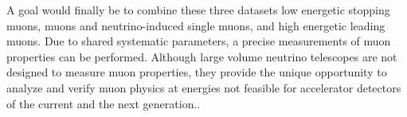 A goal would finally be to combine these three datasets low energetic stopping muons, muons and neutrino-induced single muons, and high energetic leading muons.
Due to shared systematic parameters, a precise measurements of muon properties can be performed.
Although large volume neutrino telescopes are not designed to measure muon properties, they provide the unique opportunity to analyze and verify muon physics at energies not feasible for accelerator detectors of the current and the next generation..
